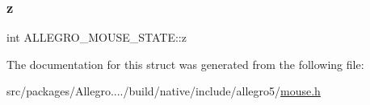\mbox{\label{struct_a_l_l_e_g_r_o___m_o_u_s_e___s_t_a_t_e_a472256bc97d5af976df42eda84e739f4}} 
\subsubsection{\texorpdfstring{z}{z}}
{\footnotesize\ttfamily int A\+L\+L\+E\+G\+R\+O\+\_\+\+M\+O\+U\+S\+E\+\_\+\+S\+T\+A\+T\+E\+::z}



The documentation for this struct was generated from the following file\+:\begin{DoxyCompactItemize}
\item 
src/packages/\+Allegro..../build/native/include/allegro5/\hyperlink{mouse_8h}{mouse.\+h}\end{DoxyCompactItemize}
